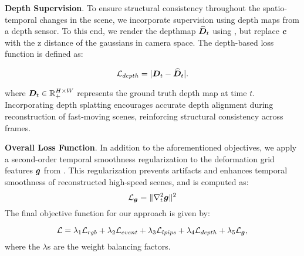 \vspace{1mm}
\noindent
\textbf{Depth Supervision}. 
To ensure structural consistency throughout the spatio-temporal changes in the scene, we incorporate supervision using depth maps from a depth sensor. To this end, we render the depthmap $\widehat{\bm{D}}_t$ using \equationautorefname{~\ref{alpha_blending}}, but replace $\bm{c}$ with the z distance of the gaussians in camera space.
The depth-based loss function is defined as:

\begin{equation}
\mathcal{L}_{depth}=|\bm{D}_t-\widehat{\bm{D}}_t|.
\end{equation}

where $\bm{D}_t\in\mathbb{R}^{H\times W}_{+}$ represents the ground truth depth map at time $t$. 
Incorporating depth splatting encourages accurate depth alignment during reconstruction of fast-moving scenes, reinforcing structural consistency across frames.

\vspace{1mm}
\noindent
\textbf{Overall Loss Function}. 
In addition to the aforementioned objectives, we apply a second-order temporal smoothness regularization \cite{cao2023hexplane} to the deformation grid features $\bm{g}$ from \equationautorefname{~\ref{eq:deformation-field}}.
This regularization prevents artifacts and enhances temporal smoothness of reconstructed high-speed scenes, and is computed as:
\begin{equation}
    \mathcal{L}_{\bm{g}} = \|\nabla^2_{t}\bm{g}\|^2
\end{equation}
The final objective function for our approach is given by:

\begin{equation}
\mathcal{L}=\lambda_1 \mathcal{L}_{rgb}+\lambda_2 \mathcal{L}_{event} + \lambda_3 \mathcal{L}_{lpips} + \lambda_4 \mathcal{L}_{depth} + \lambda_5 \mathcal{L}_{\bm{g}},
\label{eq:final-objective}
\end{equation}
where the $\lambda$s are the weight balancing factors.



